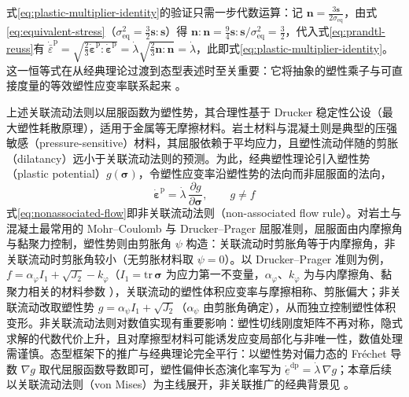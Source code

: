 式\eqref{eq:plastic-multiplier-identity}的验证只需一步代数运算：记 $\mathbf{n}=\tfrac{3\mathbf{s}}{2\sigma_{\mathrm{eq}}}$，由式\eqref{eq:equivalent-stress}（$\sigma_{\mathrm{eq}}^{2}=\tfrac{3}{2}\mathbf{s}:\mathbf{s}$）得 $\mathbf{n}:\mathbf{n}=\tfrac{9}{4}\mathbf{s}:\mathbf{s}/\sigma_{\mathrm{eq}}^{2}=\tfrac{3}{2}$，代入式\eqref{eq:prandtl-reuss}有 $\dot{\bar{\varepsilon}}^{\mathrm{p}}=\sqrt{\tfrac{2}{3}\dot{\boldsymbol{\varepsilon}}^{\mathrm{p}}:\dot{\boldsymbol{\varepsilon}}^{\mathrm{p}}}=\dot{\lambda}\sqrt{\tfrac{2}{3}\mathbf{n}:\mathbf{n}}=\dot{\lambda}$，此即式\eqref{eq:plastic-multiplier-identity}。这一恒等式在从经典理论过渡到态型表述时至关重要：它将抽象的塑性乘子与可直接度量的等效塑性应变率联系起来 \cite{SimoHughes1998}。

上述关联流动法则以屈服函数为塑性势，其合理性基于 Drucker 稳定性公设（最大塑性耗散原理），适用于金属等无摩擦材料。岩土材料与混凝土则是典型的压强敏感（pressure-sensitive）材料，其屈服依赖于平均应力，且塑性流动伴随的剪胀（dilatancy）远小于关联流动法则的预测。为此，经典塑性理论引入塑性势（plastic potential）$g(\boldsymbol{\sigma})$，令塑性应变率沿塑性势的法向而非屈服面的法向，
\begin{equation}
  \dot{\boldsymbol{\varepsilon}}^{\mathrm{p}}=\dot{\lambda}\,\frac{\partial g}{\partial\boldsymbol{\sigma}},\qquad g\neq f
  \label{eq:nonassociated-flow}
\end{equation}
式\eqref{eq:nonassociated-flow}即非关联流动法则（non-associated flow rule）\cite{VermeerDeBorst1984}。对岩土与混凝土最常用的 Mohr–Coulomb 与 Drucker–Prager 屈服准则，屈服面由内摩擦角与黏聚力控制，塑性势则由剪胀角 $\psi$ 构造：关联流动时剪胀角等于内摩擦角，非关联流动时剪胀角较小（无剪胀材料取 $\psi=0$）。以 Drucker–Prager 准则为例，$f=\alpha_{\varphi}I_{1}+\sqrt{J_{2}}-k_{\varphi}$（$I_{1}=\mathrm{tr}\,\boldsymbol{\sigma}$ 为应力第一不变量，$\alpha_{\varphi}$、$k_{\varphi}$ 为与内摩擦角、黏聚力相关的材料参数 \cite{DruckerPrager1952}），关联流动的塑性体积应变率与摩擦相称、剪胀偏大；非关联流动改取塑性势 $g=\alpha_{\psi}I_{1}+\sqrt{J_{2}}$（$\alpha_{\psi}$ 由剪胀角确定），从而独立控制塑性体积变形。非关联流动法则对数值实现有重要影响：塑性切线刚度矩阵不再对称，隐式求解的代数代价上升，且对摩擦型材料可能诱发应变局部化与非唯一性，数值处理需谨慎。态型框架下的推广与经典理论完全平行：以塑性势对偏力态的 Fréchet 导数 $\nabla g$ 取代屈服函数导数即可，塑性偏伸长态演化率写为 $\dot{\underline{e}}^{\mathrm{dp}}=\dot{\lambda}\,\nabla g$；本章后续以关联流动法则（von Mises）为主线展开，非关联推广的经典背景见 \cite{VermeerDeBorst1984,SimoHughes1998}。

